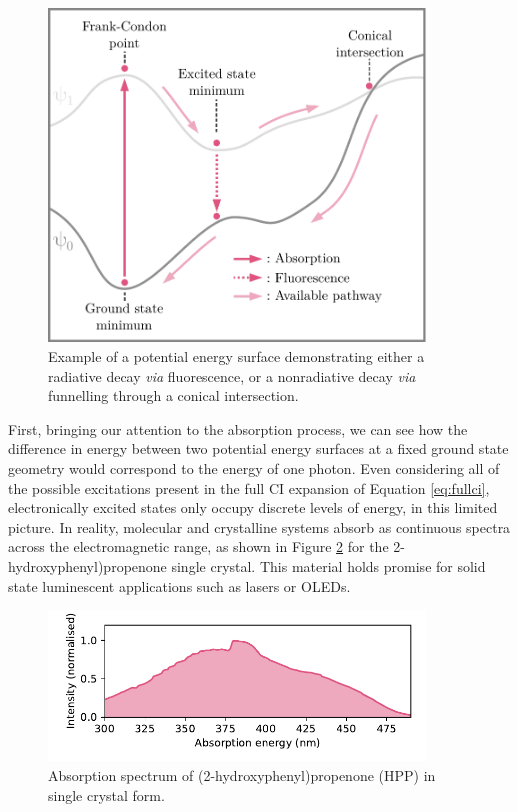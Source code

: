 \begin{figure}
\centering
\includegraphics[width=10cm]{Chapters/4Photochem/PES.pdf}
\caption{Example of a potential energy surface demonstrating either a radiative decay \textit{via} fluorescence, or a nonradiative decay \textit{via} funnelling through a conical intersection.}
\label{fig:pes_example}
\end{figure}

First, bringing our attention to the absorption process, we can see how the difference in energy between two potential energy surfaces at a fixed ground state geometry would correspond to the energy of one photon. Even considering all of the possible excitations present in the full CI expansion of Equation \ref{eq:fullci}, electronically excited states only occupy discrete levels of energy, in this limited picture. In reality, molecular and crystalline systems absorb as continuous spectra across the electromagnetic range, as shown in Figure \ref{fig:hpp_abs} for the 2-hydroxyphenyl)propenone single crystal. This material holds promise for solid state luminescent applications such as lasers or OLEDs.\cite{Tang2016a}

\begin{figure}
\centering
\includegraphics[width=10cm]{Chapters/4Photochem/hpp_abs.pdf}
\caption{Absorption spectrum of (2-hydroxyphenyl)propenone (HPP) in single crystal form.\cite{Tang2016a}}
\label{fig:hpp_abs}
\end{figure}

